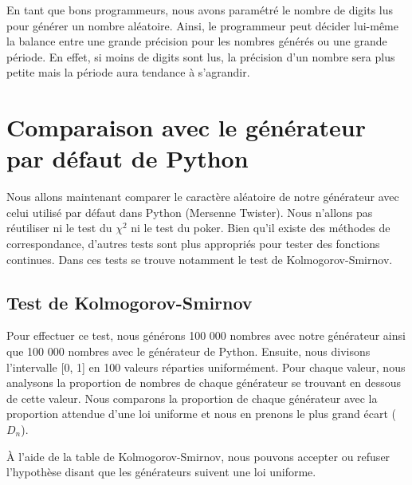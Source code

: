 \documentclass[10pt,a4paper]{article}
\begin{document}
	En tant que bons programmeurs, nous avons paramétré le nombre de digits lus pour générer un nombre aléatoire.
	Ainsi, le programmeur peut décider lui-même la balance entre une grande précision pour les nombres générés ou une grande période.
	En effet, si moins de digits sont lus, la précision d'un nombre sera plus petite mais la période aura tendance à s'agrandir.
	
	\newpage
	\section{Comparaison avec le générateur par défaut de Python}
	Nous allons maintenant comparer le caractère aléatoire de notre générateur avec celui utilisé par défaut dans Python (Mersenne Twister).
	Nous n'allons pas réutiliser ni le test du $\chi^2$ ni le test du poker.
	Bien qu'il existe des méthodes de correspondance, d'autres tests sont plus appropriés pour tester des fonctions continues.
	Dans ces tests se trouve notamment le test de Kolmogorov-Smirnov.
	
	\newpage
	\subsection{Test de Kolmogorov-Smirnov}
	
	Pour effectuer ce test, nous générons 100 000 nombres avec notre générateur ainsi que 100 000 nombres avec le générateur de Python.
	Ensuite, nous divisons l'intervalle [0, 1] en 100 valeurs réparties uniformément.
	Pour chaque valeur, nous analysons la proportion de nombres de chaque générateur se trouvant en dessous de cette valeur.
	Nous comparons la proportion de chaque générateur avec la proportion attendue d'une loi uniforme et nous en prenons le plus grand écart ($D_n$).
	
	À l'aide de la table de Kolmogorov-Smirnov, nous pouvons accepter ou refuser l'hypothèse disant que les générateurs suivent une loi uniforme.
	
\end{document}
